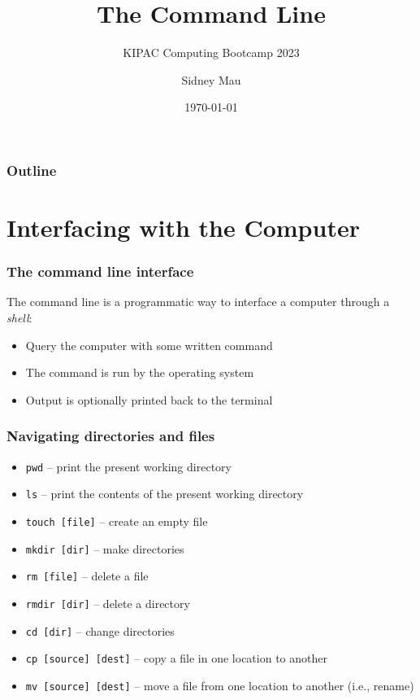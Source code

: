 \documentclass[aspectratio=169]{beamer}
\title{The Command Line}
\subtitle{KIPAC Computing Bootcamp 2023}
\author[S. Mau]{Sidney Mau}
\institute[Stanford]{Stanford University}
\date[\today]{\today}
\begin{document}

\frame{\titlepage}

\begin{frame}
	\frametitle{Outline}
	\tableofcontents
\end{frame}


\section{Interfacing with the Computer}

\frame{\sectionpage}

\begin{frame}
	\frametitle{The command line interface}
	The command line is a programmatic way to interface a computer through a \emph{shell}:
	\begin{itemize}
		\item Query the computer with some written command
		\item The command is run by the operating system
		\item Output is optionally printed back to the terminal
	\end{itemize}
\end{frame}

\begin{frame}
	\frametitle{Navigating directories and files}
	\begin{itemize}
		\item \texttt{pwd} -- print the present working directory
		\item \texttt{ls} -- print the contents of the present working directory
		\item \texttt{touch [file]} -- create an empty file
		\item \texttt{mkdir [dir]} -- make directories
		\item \texttt{rm [file]} -- delete a file
		\item \texttt{rmdir [dir]} -- delete a directory
		\item \texttt{cd [dir]} -- change directories
		\item \texttt{cp [source] [dest]} -- copy a file in one location to another
		\item \texttt{mv [source] [dest]} -- move a file from one location to another (i.e., rename)
	\end{itemize}
\end{frame}
\end{document}
